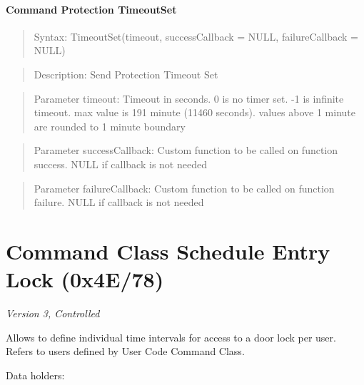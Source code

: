\paragraph{Command Protection TimeoutSet}
\begin{quote}Syntax: TimeoutSet(timeout, successCallback = NULL, failureCallback = NULL)\end{quote}
\begin{quote}Description: Send Protection Timeout Set\end{quote}
\begin{quote}Parameter timeout: Timeout in seconds. 0 is no timer set. -1 is infinite timeout. max value is 191 minute (11460 seconds). values above 1 minute are rounded to 1 minute boundary\end{quote}
\begin{quote}Parameter successCallback: Custom function to be called on function success. NULL if callback is not needed\end{quote}
\begin{quote}Parameter failureCallback: Custom function to be called on function failure. NULL if callback is not needed\end{quote}



\section{Command Class Schedule Entry Lock (0x4E/78)}

\textit{Version 3, Controlled}
\newline

Allows to define individual time intervals for access to a door lock per user. Refers to users defined by User Code Command Class.
\newline

\noindent
Data holders:

